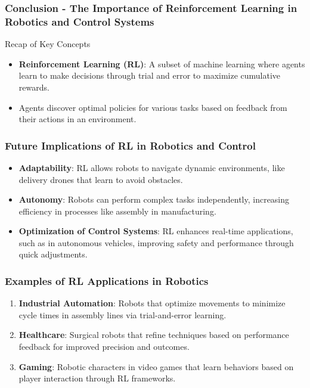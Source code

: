 \documentclass[aspectratio=169]{beamer}
\begin{document}
\begin{frame}[fragile]
    \frametitle{Conclusion - The Importance of Reinforcement Learning in Robotics and Control Systems}
    \begin{block}{Recap of Key Concepts}
        \begin{itemize}
            \item \textbf{Reinforcement Learning (RL)}: A subset of machine learning where agents learn to make decisions through trial and error to maximize cumulative rewards.
            \item Agents discover optimal policies for various tasks based on feedback from their actions in an environment.
        \end{itemize}
    \end{block}
\end{frame}

\begin{frame}[fragile]
    \frametitle{Future Implications of RL in Robotics and Control}
    \begin{itemize}
        \item \textbf{Adaptability}: RL allows robots to navigate dynamic environments, like delivery drones that learn to avoid obstacles.
        
        \item \textbf{Autonomy}: Robots can perform complex tasks independently, increasing efficiency in processes like assembly in manufacturing.
        
        \item \textbf{Optimization of Control Systems}: RL enhances real-time applications, such as in autonomous vehicles, improving safety and performance through quick adjustments.
    \end{itemize}
\end{frame}

\begin{frame}[fragile]
    \frametitle{Examples of RL Applications in Robotics}
    \begin{enumerate}
        \item \textbf{Industrial Automation}: Robots that optimize movements to minimize cycle times in assembly lines via trial-and-error learning.
        
        \item \textbf{Healthcare}: Surgical robots that refine techniques based on performance feedback for improved precision and outcomes.
        
        \item \textbf{Gaming}: Robotic characters in video games that learn behaviors based on player interaction through RL frameworks.
    \end{enumerate}
\end{frame}
\end{document}
